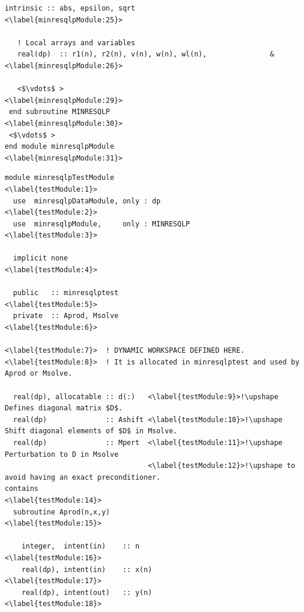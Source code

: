 \documentclass{doc_acmtrans2m}
\begin{document}
\begin{lstlisting}[frame=TB,float,caption=Partial code listing of
                   subroutine MINRESQLP in minresqlpModule.,
                   label=code:minresqlpModule,texcl]
   intrinsic :: abs, epsilon, sqrt              <\label{minresqlpModule:25}>

   ! Local arrays and variables
   real(dp)  :: r1(n), r2(n), v(n), w(n), wl(n),               &<\label{minresqlpModule:26}>

   <$\vdots$ >                                                  <\label{minresqlpModule:29}>
 end subroutine MINRESQLP                                       <\label{minresqlpModule:30}>
 <$\vdots$ >
end module minresqlpModule                                      <\label{minresqlpModule:31}>
\end{lstlisting}
 

\begin{lstlisting}[frame=TB,float,caption=Partial code listing of
                   minresqlpTestModule.,label=code:testModule,texcl]
module minresqlpTestModule                            <\label{testModule:1}>
  use  minresqlpDataModule, only : dp                 <\label{testModule:2}>
  use  minresqlpModule,     only : MINRESQLP          <\label{testModule:3}>

  implicit none                                       <\label{testModule:4}>

  public   :: minresqlptest                           <\label{testModule:5}>
  private  :: Aprod, Msolve                           <\label{testModule:6}>

<\label{testModule:7}>  ! DYNAMIC WORKSPACE DEFINED HERE.
<\label{testModule:8}>  ! It is allocated in minresqlptest and used by Aprod or Msolve.

  real(dp), allocatable :: d(:)   <\label{testModule:9}>!\upshape Defines diagonal matrix $D$.
  real(dp)              :: Ashift <\label{testModule:10}>!\upshape Shift diagonal elements of $D$ in Msolve.
  real(dp)              :: Mpert  <\label{testModule:11}>!\upshape Perturbation to D in Msolve
                                  <\label{testModule:12}>!\upshape to avoid having an exact preconditioner.
contains                                                       <\label{testModule:14}>
  subroutine Aprod(n,x,y)                                      <\label{testModule:15}>

    integer,  intent(in)    :: n                               <\label{testModule:16}>
    real(dp), intent(in)    :: x(n)                            <\label{testModule:17}>
    real(dp), intent(out)   :: y(n)                            <\label{testModule:18}>


\end{lstlisting}
\end{document}
